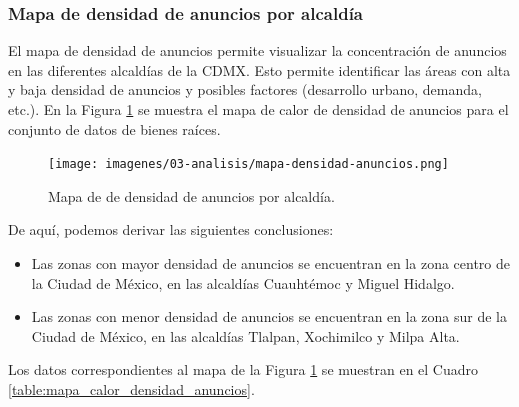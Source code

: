 \subsubsection{Mapa de densidad de anuncios por alcaldía}

El mapa de densidad de anuncios permite visualizar la concentración de
anuncios en las diferentes alcaldías de la CDMX. Esto permite identificar las áreas con alta y baja
densidad de anuncios y posibles factores (desarrollo urbano, demanda, etc.). En
la Figura \ref{fig:mapa_calor_densidad_anuncios} se muestra el mapa de calor de
densidad de anuncios para el conjunto de datos de bienes raíces.

\begin{figure}[H]
  \centering
  \texttt{[image: imagenes/03-analisis/mapa-densidad-anuncios.png]}
  \caption{Mapa de de densidad de anuncios por alcaldía.}
  \label{fig:mapa_calor_densidad_anuncios}
\end{figure}

De aquí, podemos derivar las siguientes conclusiones:

\begin{itemize}
  \item Las zonas con mayor densidad de anuncios se encuentran en la zona centro
  de la Ciudad de México, en las alcaldías Cuauhtémoc y Miguel Hidalgo.
  \item Las zonas con menor densidad de anuncios se encuentran en la zona sur
  de la Ciudad de México, en las alcaldías Tlalpan, Xochimilco y Milpa Alta.
\end{itemize}

Los datos correspondientes al mapa de la Figura \ref{fig:mapa_calor_densidad_anuncios}
se muestran en el Cuadro \ref{table:mapa_calor_densidad_anuncios}.

